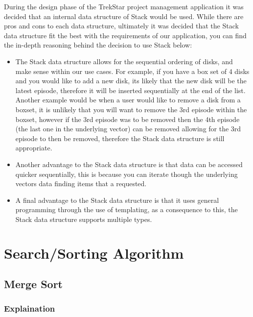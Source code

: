 \documentclass[
  english,
  a4paper,
,tablecaptionabove
]{scrartcl}
\providecommand{\tightlist}{%
  \setlength{\itemsep}{0pt}\setlength{\parskip}{0pt}}
\begin{document}
During the design phase of the TrekStar project management application
it was decided that an internal data structure of Stack would be used.
While there are pros and cons to each data structure, ultimately it was
decided that the Stack data structure fit the best with the requirements
of our application, you can find the in-depth reasoning behind the
decision to use Stack below:

\begin{itemize}
\tightlist
\item
  The Stack data structure allows for the sequential ordering of disks,
  and make sense within our use cases. For example, if you have a box
  set of 4 disks and you would like to add a new disk, its likely that
  the new disk will be the latest episode, therefore it will be inserted
  sequentially at the end of the list. Another example would be when a
  user would like to remove a disk from a boxset, it is unlikely that
  you will want to remove the 3rd episode within the boxset, however if
  the 3rd episode was to be removed then the 4th episode (the last one
  in the underlying vector) can be removed allowing for the 3rd episode
  to then be removed, therefore the Stack data structure is still
  appropriate.
\item
  Another advantage to the Stack data structure is that data can be
  accessed quicker sequentially, this is because you can iterate though
  the underlying vectors data finding items that a requested.
\item
  A final advantage to the Stack data structure is that it uses general
  programming through the use of templating, as a consequence to this,
  the Stack data structure supports multiple types.
\end{itemize}

\newpage

\hypertarget{searchsorting-algorithm}{%
\section{Search/Sorting Algorithm}\label{searchsorting-algorithm}}

\hypertarget{merge-sort}{%
\subsection{Merge Sort}\label{merge-sort}}

\hypertarget{explaination}{%
\subsubsection{Explaination}\label{explaination}}
\end{document}
